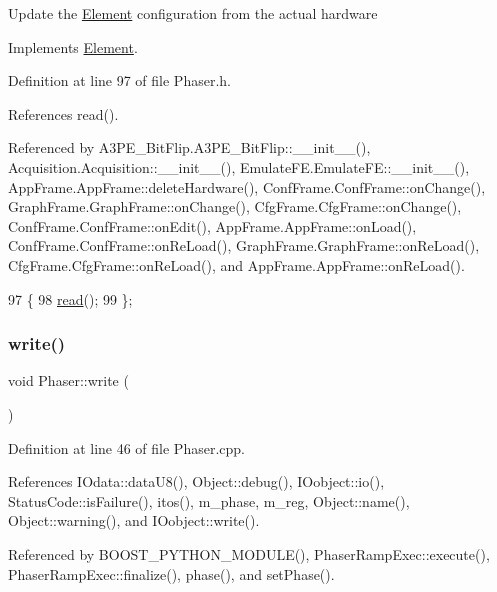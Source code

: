Update the \hyperlink{classElement}{Element} configuration from the actual hardware 

Implements \hyperlink{classElement_a4e6c83efae95616ebddd03c793a26661}{Element}.



Definition at line 97 of file Phaser.\+h.



References read().



Referenced by A3\+P\+E\+\_\+\+Bit\+Flip.\+A3\+P\+E\+\_\+\+Bit\+Flip\+::\+\_\+\+\_\+init\+\_\+\+\_\+(), Acquisition.\+Acquisition\+::\+\_\+\+\_\+init\+\_\+\+\_\+(), Emulate\+F\+E.\+Emulate\+F\+E\+::\+\_\+\+\_\+init\+\_\+\+\_\+(), App\+Frame.\+App\+Frame\+::delete\+Hardware(), Conf\+Frame.\+Conf\+Frame\+::on\+Change(), Graph\+Frame.\+Graph\+Frame\+::on\+Change(), Cfg\+Frame.\+Cfg\+Frame\+::on\+Change(), Conf\+Frame.\+Conf\+Frame\+::on\+Edit(), App\+Frame.\+App\+Frame\+::on\+Load(), Conf\+Frame.\+Conf\+Frame\+::on\+Re\+Load(), Graph\+Frame.\+Graph\+Frame\+::on\+Re\+Load(), Cfg\+Frame.\+Cfg\+Frame\+::on\+Re\+Load(), and App\+Frame.\+App\+Frame\+::on\+Re\+Load().


\begin{DoxyCode}
97                  \{
98     \hyperlink{classPhaser_a6ce0713403e961495192ffa0590c29e4}{read}();
99   \};
\end{DoxyCode}
\mbox{\label{classPhaser_a7a94d4129a5f743c482fa97f3c5df68f}} 
\subsubsection{\texorpdfstring{write()}{write()}}
{\footnotesize\ttfamily void Phaser\+::write (\begin{DoxyParamCaption}{ }\end{DoxyParamCaption})}



Definition at line 46 of file Phaser.\+cpp.



References I\+Odata\+::data\+U8(), Object\+::debug(), I\+Oobject\+::io(), Status\+Code\+::is\+Failure(), itos(), m\+\_\+phase, m\+\_\+reg, Object\+::name(), Object\+::warning(), and I\+Oobject\+::write().



Referenced by B\+O\+O\+S\+T\+\_\+\+P\+Y\+T\+H\+O\+N\+\_\+\+M\+O\+D\+U\+L\+E(), Phaser\+Ramp\+Exec\+::execute(), Phaser\+Ramp\+Exec\+::finalize(), phase(), and set\+Phase().



